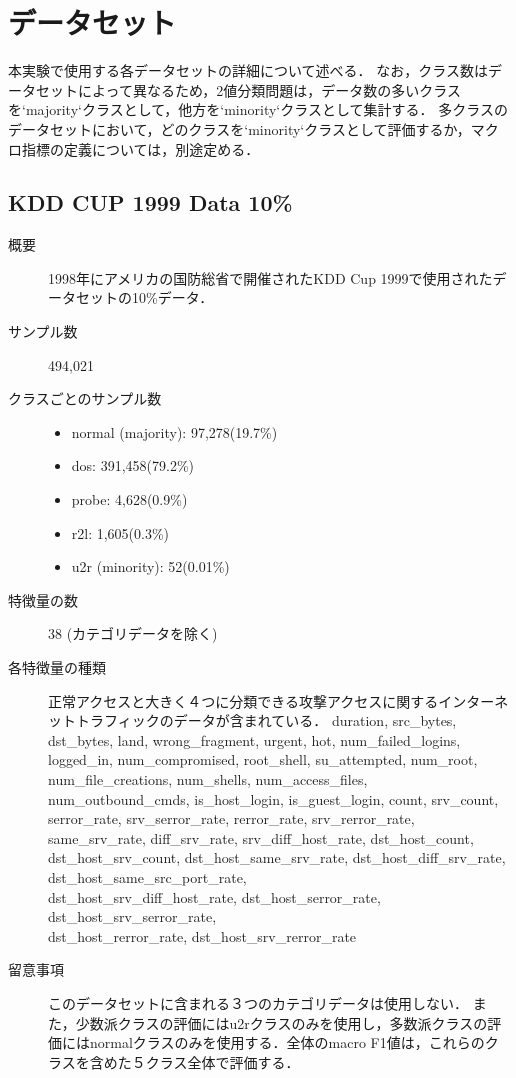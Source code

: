 \section{データセット}
本実験で使用する各データセットの詳細について述べる．
なお，クラス数はデータセットによって異なるため，2値分類問題は，データ数の多いクラスを`majority`クラスとして，他方を`minority`クラスとして集計する．
多クラスのデータセットにおいて，どのクラスを`minority`クラスとして評価するか，マクロ指標の定義については，別途定める．

\subsection{KDD CUP 1999 Data 10\%}
\begin{description}
    \item[概要] 1998年にアメリカの国防総省で開催されたKDD Cup 1999で使用されたデータセットの10\%データ．
    \item[サンプル数] 494,021
    \item[クラスごとのサンプル数] \mbox{}
        \begin{itemize}
            \item normal (majority):  97,278(19.7\%)
            \item dos:      391,458(79.2\%)
            \item probe:    4,628(0.9\%)
            \item r2l:      1,605(0.3\%)
            \item u2r (minority):      52(0.01\%)
        \end{itemize}
    \item[特徴量の数] 38 (カテゴリデータを除く)
    \item[各特徴量の種類] 正常アクセスと大きく４つに分類できる攻撃アクセスに関するインターネットトラフィックのデータが含まれている．
            duration, src\_bytes, dst\_bytes, land, wrong\_fragment, urgent, hot, num\_failed\_logins, logged\_in, num\_compromised, root\_shell, su\_attempted, num\_root, num\_file\_creations, num\_shells, num\_access\_files, num\_outbound\_cmds, is\_host\_login, is\_guest\_login, count, srv\_count, serror\_rate, srv\_serror\_rate, rerror\_rate, srv\_rerror\_rate, same\_srv\_rate, diff\_srv\_rate, srv\_diff\_host\_rate, dst\_host\_count, dst\_host\_srv\_count, dst\_host\_same\_srv\_rate, dst\_host\_diff\_srv\_rate, dst\_host\_same\_src\_port\_rate, \\dst\_host\_srv\_diff\_host\_rate, dst\_host\_serror\_rate, dst\_host\_srv\_serror\_rate, \\dst\_host\_rerror\_rate, dst\_host\_srv\_rerror\_rate
    \item[留意事項] このデータセットに含まれる３つのカテゴリデータは使用しない．
                   また，少数派クラスの評価にはu2rクラスのみを使用し，多数派クラスの評価にはnormalクラスのみを使用する．全体のmacro F1値は，これらのクラスを含めた５クラス全体で評価する．
\end{description}

